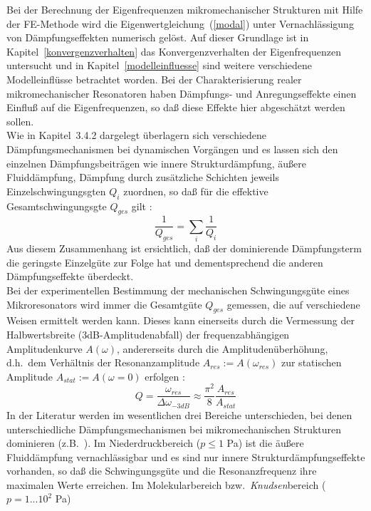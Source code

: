 Bei der Berechnung der Eigenfrequenzen mikromechanischer Strukturen
mit Hilfe der FE-Methode wird die Eigenwertgleichung~(\ref{modal})
unter Vernachlässigung von Dämpfungseffekten numerisch gelöst. Auf dieser
Grundlage ist in Kapitel~\ref{konvergenzverhalten} das Konvergenzverhalten
der Eigenfrequenzen untersucht und in Kapitel~\ref{modelleinfluesse} sind
weitere verschiedene Modelleinflüsse betrachtet worden. Bei der
Charakterisierung realer mikromechanischer Resonatoren haben Dämpfungs- und
Anregungseffekte einen Einfluß auf die Eigenfrequenzen, so daß diese
Effekte hier abgeschätzt werden sollen.\\
%
Wie in Kapitel~3.4.2 dargelegt überlagern sich verschiedene
Dämpfungsmechanismen bei dynamischen Vorgängen und es lassen sich den
einzelnen Dämpfungsbeiträgen wie innere Strukturdämpfung, äußere
Fluiddämpfung, Dämpfung durch zusätzliche Schichten jeweils
Einzelschwingungsgten $Q_{i}$ zuordnen, so daß für die effektive
Gesamtschwingungsgte $Q_{ges}$ gilt \cite{Til92}:
\begin{equation}
\label{qsum}
 \frac{1}{Q_{ges}} = \sum_{i} \frac{1}{Q_{i}}
\end{equation}
Aus diesem Zusammenhang ist ersichtlich, daß der dominierende Dämpfungsterm
die geringste Einzelgüte zur Folge hat und dementsprechend die anderen
Dämpfungseffekte überdeckt.\\
%
Bei der experimentellen Bestimmung der mechanischen Schwingungsgüte eines
Mikroresonators wird immer die Gesamtgüte $Q_{ges}$ gemessen, die auf
verschiedene Weisen ermittelt werden kann. Dieses kann einerseits durch die
Vermessung der Halbwertsbreite (3dB-Amplitudenabfall) der frequenzabhängigen
Amplitudenkurve $A(\omega)$, andererseits durch die Amplitudenüberhöhung,
d.h.\ dem Verhältnis der Resonanzamplitude $A_{res} := A(\omega_{res})$
zur statischen Amplitude $A_{stat} := A(\omega=0)$ erfolgen
\cite{VIB}:
\begin{equation}
\label{qmess}
 Q = \frac{\omega_{res}}{\Delta \omega_{-3dB}}
    \approx \frac{\pi^2}{8} \frac{A_{res}}{A_{stat}}
\end{equation}
%
In der Literatur werden im wesentlichen drei Bereiche unterschieden, bei
denen unterschiedliche Dämpfungsmechanismen bei mikromechanischen Strukturen
dominieren (z.B.\ \cite{Blo92}). Im Niederdruckbereich ($p \leq 1$ Pa)
ist die äußere Fluiddämpfung vernachlässigbar und es sind nur innere
Strukturdämpfungseffekte vorhanden, so daß die Schwingungsgüte und die
Resonanzfrequenz ihre maximalen Werte erreichen.
Im Molekularbereich bzw.\ {\sl Knudsen}bereich ($p=1...10^2$ Pa)
